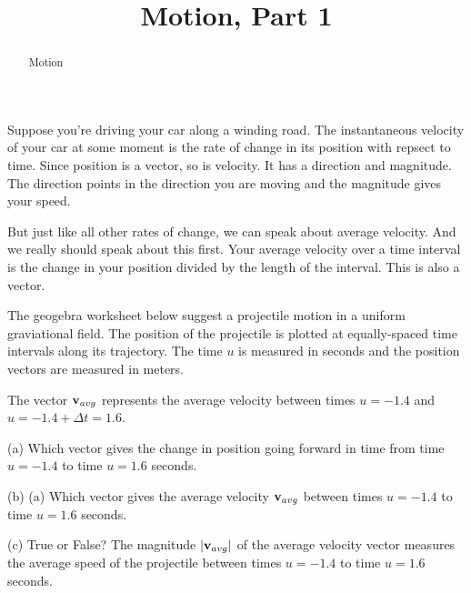 \documentclass{ximera}
\title{Motion, Part 1}
\begin{document}
\begin{abstract}
Motion
\end{abstract}
\maketitle


\begin{exploration}
Suppose  you're driving your car along a winding road. The instantaneous velocity of your car at some moment is the rate of change in its position with repsect to time. Since position is a vector, so is velocity. It has a direction and magnitude. The direction points in the direction you are moving  and the magnitude gives your speed.

But just like all other rates of change, we can speak about average velocity. And we really should speak about this first. Your average velocity over a time interval is the change in your position divided by the length of the interval. This is also a vector.

The geogebra worksheet below suggest a projectile motion in a uniform graviational field. The position of the projectile is plotted at equally-spaced time intervals along its trajectory. The time $u$ is measured in seconds and the position vectors are measured in meters.

The vector ${\bf v}_{avg}$ represents the average velocity between times $u=-1.4$ and $u=-1.4+\Delta t = 1.6$. 

\begin{question}  \label{Qfdhgyuj:Motion}
(a) Which vector gives the change in position going forward in time from time $u=-1.4$ to time $u=1.6$ seconds. 
\begin{multipleChoice}  
\end{multipleChoice}  


(b) (a) Which vector gives the average velocity ${\bf v}_{avg}$ between times $u=-1.4$ to time $u=1.6$ seconds. 
\begin{multipleChoice}  
\end{multipleChoice}  


(c) True or False? 
The magnitude $| {\bf v}_{avg} |$ of the average velocity vector measures the average speed of the projectile between times $u=-1.4$ to time $u=1.6$ seconds.
\begin{multipleChoice}  
\end{multipleChoice}  





\end{question}
\end{exploration}
\end{document}
